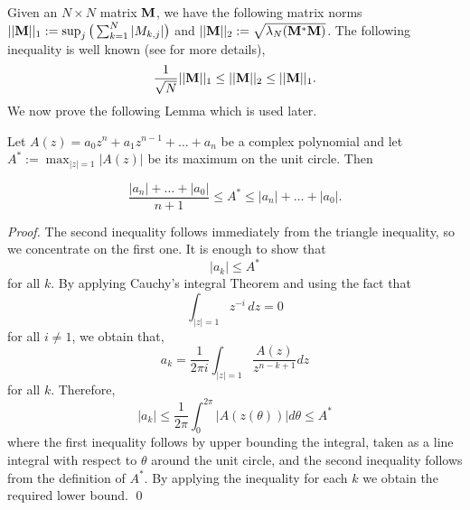 \documentclass[smallextended]{svjour3}
\begin{document}
Given an $N\times N$ matrix ${\bf M}$, we have the following matrix norms ${\lvert \lvert {{\bf M}} \rvert \rvert_1}:= \sup_{j} \big( \sum_{k=1}^N \vert M_{k,j} \vert \big)$ and ${\lvert \lvert {{\bf M}} \rvert \rvert_2}  :=  \sqrt{\lambda_N({\bf M}^* {\bf M})}$. The following inequality is well known (see \cite{HornJohnson} for more details),
$$
\frac{1}{\sqrt{N}} {\lvert \lvert {{\bf M}} \rvert \rvert_1} \leq {\lvert \lvert {{\bf M}} \rvert \rvert_2} \leq {\lvert \lvert {{\bf M}} \rvert \rvert_1}. 
$$
We now prove the following Lemma which is used later.
\begin{lemma}\label{lemma_poly}
Let $A(z) = a_0 z^n + a_1 z^{n-1} + \ldots + a_n$ be a complex polynomial and
let $A^* := \max_{\lvert z \rvert = 1} \lvert A(z) \rvert$ be its maximum on the unit circle. Then

\begin{equation}
 \frac{\lvert a_n \rvert + \ldots + \lvert a_0 \rvert}{n+1} \leq A^* \leq  \lvert a_n \rvert + \ldots + \lvert a_0 \rvert.
\label{eqn_sstar}
\end{equation}

\end{lemma}
\begin{proof}
The second inequality follows immediately from the triangle inequality, so we concentrate on the first one.
It is enough to show that
\begin{equation}
\lvert a_k \rvert \leq A^*
\label{eqn_aineq}
\end{equation}
for all $k$. By applying Cauchy's integral Theorem and using the fact that
$$
\int_{\lvert z \rvert = 1}{z^{-i}\,dz} = 0
$$
for all $i\neq 1$, we obtain that,
\begin{equation}
a_k = \frac{1}{2\pi i} \int_{\lvert z \rvert = 1} \frac{A(z)}{z^{n-k+1}} dz
\end{equation}
for all $k$. Therefore,
\begin{equation}
\lvert a_k \rvert \leq \frac{1}{2\pi} \int_{0}^{2\pi} \lvert A(z(\theta)) \rvert d\theta \leq A^* \nonumber 
\label{eqn_polyineq}
\end{equation}
where the first inequality follows by upper bounding the integral, taken as a line integral with respect to $\theta$ around the unit circle, and the second inequality follows from the definition of $A^*$. By applying the inequality for each $k$ we obtain the required lower bound.
\qed \end{proof}
\end{document}
